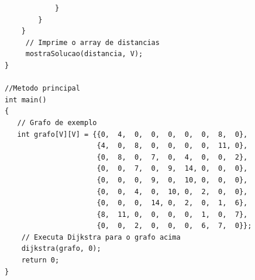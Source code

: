 \documentclass[12pt]{article}
\begin{document}
\begin{lstlisting}
			}
		}
	}
     // Imprime o array de distancias
     mostraSolucao(distancia, V);
}

//Metodo principal
int main()
{
   // Grafo de exemplo
   int grafo[V][V] = {{0,  4,  0,  0,  0,  0,  0,  8,  0},
                      {4,  0,  8,  0,  0,  0,  0,  11, 0},
                      {0,  8,  0,  7,  0,  4,  0,  0,  2},
                      {0,  0,  7,  0,  9,  14, 0,  0,  0},
                      {0,  0,  0,  9,  0,  10, 0,  0,  0},
                      {0,  0,  4,  0,  10, 0,  2,  0,  0},
                      {0,  0,  0,  14, 0,  2,  0,  1,  6},
                      {8,  11, 0,  0,  0,  0,  1,  0,  7},
                      {0,  0,  2,  0,  0,  0,  6,  7,  0}};
	// Executa Dijkstra para o grafo acima
    dijkstra(grafo, 0);
    return 0;
}


 

\end{lstlisting}
\end{document}
